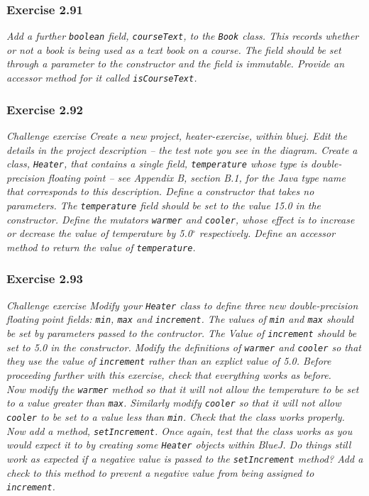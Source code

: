 \subsubsection*{Exercise 2.91}
\textit{Add a further \lstinline{boolean} field, \lstinline{courseText}, to 
the \lstinline{Book} class. This records whether or not a book is being used 
as a text book on a course. The field should be set through a parameter to the 
constructor and the field is immutable. Provide an accessor method for it 
called \lstinline{isCourseText}. }\\

\subsubsection*{Exercise 2.92}
\textit{Challenge exercise Create a new project, heater-exercise, within bluej. 
Edit the details in the project description -- the test note you see in the 
diagram. Create a class, \lstinline{Heater}, that contains a single field, 
\lstinline{temperature} whose type is double-precision floating point -- see 
Appendix B, section B.1, for the Java type name that corresponds to this 
description. Define a constructor that takes no parameters. The 
\lstinline{temperature} field should be set to the value 15.0 in the 
constructor. Define the mutators \lstinline{warmer} and \lstinline{cooler}, 
whose effect is to increase or decrease the value of temperature by 
5.0$^\circ$ respectively. Define an accessor method to return the value of 
\lstinline{temperature}. }\\

\subsubsection*{Exercise 2.93}
\textit{Challenge exercise Modify your \lstinline{Heater} class to define three 
new double-precision floating point fields: \lstinline{min}, \lstinline{max} 
and \lstinline{increment}. The values of \lstinline{min} and \lstinline{max} 
should be set by parameters passed to the contructor. The Value of 
\lstinline{increment} should be set to 5.0 in the constructor. Modify the 
definitions of \lstinline{warmer} and \lstinline{cooler} so that they use the 
value of \lstinline{increment} rather than an explict value of 5.0. Before 
proceeding further with this exercise, check that everything works as before. \\
Now modify the \lstinline{warmer} method so that it will not allow the 
temperature to be set to a value greater than \lstinline{max}. Similarly modify 
\lstinline{cooler} so that it will not allow \lstinline{cooler} to be set to a 
value less than \lstinline{min}. Check that the class works properly. Now add a 
method, \lstinline{setIncrement}. Once again, test that the class works as you 
would expect it to by creating some \lstinline{Heater} objects within BlueJ. Do 
things still work as expected if a negative value is passed to the 
\lstinline{setIncrement} method? Add a check to this method to prevent a 
negative value from being assigned to \lstinline{increment}. }\\

